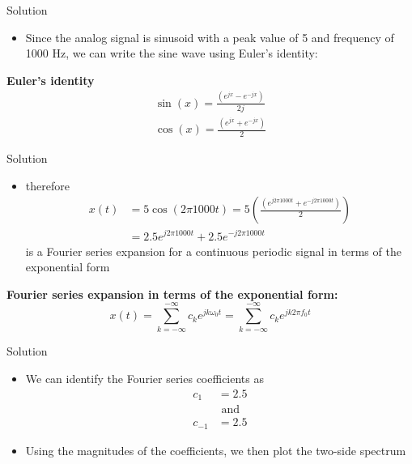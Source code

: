 \documentclass[pdflatex,compress,mathserif]{beamer}
\begin{document}
\begin{frame}{Solution}
    \begin{itemize}
        \item Since the analog signal is sinusoid with a peak value of 5 and frequency of 1000 Hz, we can write the sine wave using Euler's identity:
    \end{itemize}
    \begin{framed}
    \textbf{Euler's identity}
        \begin{align}
            \sin(x) = \frac{(e^{jx} - e^{-jx})}{2j} \\
            \cos(x) = \frac{(e^{jx} + e^{-jx})}{2}
        \end{align}
    \end{framed}
\end{frame}

\begin{frame}{Solution}
    \begin{itemize}
        \item therefore
        \begin{align*}
            x(t) &= 5 \cos (2 \pi 1000 t) = 5 \left( \frac{(e^{j2\pi 1000t} + e^{-j2\pi 1000t})}{2} \right) \\
            &= 2.5 e^{j2 \pi 1000t} + 2.5 e^{-j2 \pi 1000t}
            \label{eq:lat.soal.1}
        \end{align*}
        is a Fourier series expansion for a continuous periodic signal in terms of the exponential form
    \end{itemize}
    \begin{framed}
        \textbf{Fourier series expansion in terms of the exponential form:}
        \begin{equation*}
            x(t) = \sum_{k=-\infty}^{-\infty} c_k e^{jk\omega_0 t} = \sum_{k=-\infty}^{-\infty} c_k e^{jk 2\pi f_0 t}
        \end{equation*}
    \end{framed}
\end{frame}

\begin{frame}{Solution}
    \begin{itemize}
        \item We can identify the Fourier series coefficients as
        \begin{align*}
            c_1 &= 2.5 \\
            &\text{ and }\\
            c_{-1} &= 2.5
        \end{align*}
        \item Using the magnitudes of the coefficients, we then plot the two-side spectrum
    \end{itemize}
\end{frame}
\end{document}
